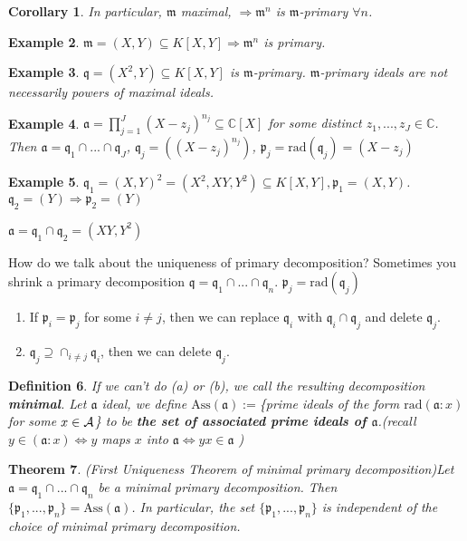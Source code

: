 \documentclass[11pt]{article}
\newtheorem{thm}{Theorem}[section]
\newtheorem{cor}[thm]{Corollary}
\newtheorem{dfn}[thm]{Definition}
\newtheorem{ex}[thm]{Example}
\newcommand{\cplx}{\mathbb C}
\newcommand{\sca}{{\mathfrak a}}
\newcommand{\scm}{{\mathfrak m}}
\newcommand{\scp}{{\mathfrak p}}
\newcommand{\scq}{\mathfrak q}
\newcommand{\cala}{{\cal A}}
\newcommand{\Lrta}{\Longrightarrow}
\newcommand{\Llrta}{\Longleftrightarrow}
\begin{document}
\begin{cor}In particular, 
$\scm$ maximal, $\Lrta\scm^n$ is $\scm$-primary $\forall n$.
\end{cor}
\begin{ex}
$\scm=(X,Y)\subseteq K[X,Y]\Lrta \scm^n$ is primary.
\end{ex}
\begin{ex}
$\scq=(X^2,Y)\subseteq K[X,Y]$ is $\scm$-primary. $\scm$-primary ideals are not necessarily powers of maximal ideals.
\end{ex}
\begin{ex}
$\sca=\prod^J_{j=1}(X-z_j)^{n_j}\subseteq \cplx[X]$ for some distinct $z_1,...,z_J\in\cplx$. Then $\sca=\scq_1\cap...\cap\scq_J$, $\scq_j=((X-z_j)^{n_j})$, $\scp_j=\text{rad}(\scq_j)=(X-z_j)$ 
\end{ex}
\begin{ex}
$\scq_1=(X,Y)^2=(X^2,XY,Y^2)\subseteq K[X,Y],\scp_1=(X,Y)$. $\scq_2=(Y)\Lrta \scp_2=(Y)$

$\sca=\scq_1\cap\scq_2=(XY,Y^2)$
\end{ex}

How do we talk about the uniqueness of primary decomposition?
Sometimes you shrink a primary decomposition $\scq=\scq_1\cap...\cap\scq_n$. $\scp_j=\text{rad}(\scq_j)$ 
\begin{enumerate}[label=(\alph*)]
\item If $\scp_i=\scp_j$ for some $i\neq j$, then we can replace $\scq_i$ with $\scq_i\cap\scq_j$ and delete $\scq_j$.
\item $\scq_j\supseteq \cap_{i\neq j}\scq_i$, then we can delete $\scq_j$.
\end{enumerate}
\begin{dfn}
If we can't do (a) or (b), we call the resulting decomposition \textbf{minimal}. Let $\sca$ ideal, we define $\text{Ass}(  \sca):=$\{prime ideals of the form $\text{rad}(\sca:x)$ for some $x\in\cala$\} to be \textbf{the set of associated prime ideals of $\sca$}.(recall $y\in(\sca:x)\Llrta y$ maps $x$ into $\sca\Llrta yx\in\sca$ )
\end{dfn}

\begin{thm}(First Uniqueness Theorem of minimal primary decomposition)\label{thm:primary_decomposition_First_uniqueness}
Let $\sca=\scq_1\cap...\cap\scq_n$ be a minimal primary decomposition. Then $\{\scp_1,...,\scp_n\}=\text{Ass}(  \sca)$. In particular, the set $\{\scp_1,...,\scp_n\}$ is independent of the choice of minimal primary decomposition.
\end{thm}
\end{document}
